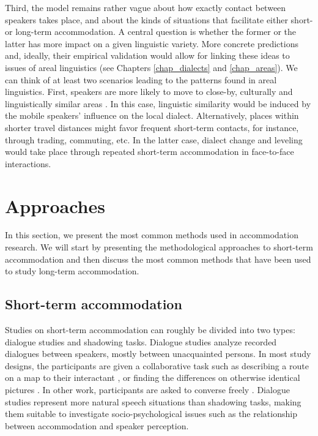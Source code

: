 \documentclass[output=paper]{langscibook}
\begin{document}
Third, the model remains rather vague about how exactly contact between speakers takes place, and about the kinds of situations that facilitate either short- or long-term accommodation. A central question is whether the former or the latter has more impact on a given linguistic variety. More concrete predictions and, ideally, their empirical validation would allow for linking these ideas to issues of areal linguistics (see Chapters \ref{chap_dialects} and \ref{chap_areas}). We can think of at least two scenarios leading to the patterns found in areal linguistics. First, speakers are more likely to move to close-by, culturally and linguistically similar areas \citep[e.g.][]{falck_cultural_2016}. In this case, linguistic similarity would be induced by the mobile speakers' influence on the local dialect. Alternatively, places within shorter travel distances might favor frequent short-term contacts, for instance, through trading, commuting, etc. In the latter case, dialect change and leveling would take place through repeated short-term accommodation in face-to-face interactions.

\section{Approaches}

In this section, we present the most common methods used in accommodation research. We will start by presenting the methodological approaches to short-term accommodation and then discuss the most common methods that have been used to study long-term accommodation.

\subsection{Short-term accommodation}
Studies on short-term accommodation can roughly be divided into two types: dialogue studies and shadowing tasks. Dialogue studies analyze recorded dialogues between speakers, mostly between unacquainted persons. In most study designs, the participants are given a collaborative task such as describing a route on a map to their interactant \citep[i.e. a map task, e.g.][]{pardo_phonetic_2006}, or finding the differences on otherwise identical pictures \citep[i.e. a diapix task, e.g.][]{kim_phonetic_2013}. In other work, participants are asked to converse freely \citep[e.g.][]{schweitzer_convergence_2013}. Dialogue studies represent more natural speech situations than shadowing tasks, making them suitable to investigate socio-psychological issues such as the relationship between accommodation and speaker perception.
\end{document}
